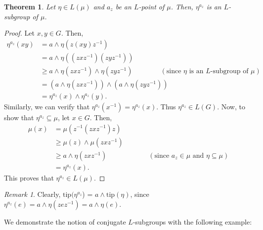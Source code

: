 \documentclass[10pt]{article}
\theoremstyle{plain}
\newtheorem{theorem}{Theorem}[section]
\theoremstyle{definition}
\theoremstyle{remark}
\newtheorem{remark}{\sc Remark}
\theoremstyle{case}
\begin{document}
\begin{theorem}
	Let $\eta \in L(\mu)$ and $a_z$ be an $L$-point of $\mu$. Then, $\eta^{a_z}$ is an $L$-subgroup of $\mu$.
\end{theorem}
\begin{proof}
	Let $x,y \in G$. Then,
	\begin{equation*}
		\begin{split}
			\eta^{a_z}(xy) &= a \wedge \eta(z(xy)z^{-1}) \\
			&= a \wedge \eta((zxz^{-1})(zyz^{-1})) \\
			&\geq a \wedge \eta(zxz^{-1}) \wedge \eta(zyz^{-1}) \qquad \qquad (\text{since $\eta$ is an $L$-subgroup of $\mu$}) \\
			&= (a \wedge \eta(zxz^{-1})) \wedge (a \wedge \eta(zyz^{-1})) \\
			&= \eta^{a_z}(x) \wedge \eta^{a_z}(y).  
		\end{split}
	\end{equation*}
	Similarly, we can verify that
	$
	\eta^{a_z}(x^{-1}) = \eta^{a_z}(x).  
	$
	Thus $\eta^{a_z} \in L(G).$ Now, to show that $\eta^{a_z} \subseteq \mu$, let $x \in G$. Then,
	\begin{equation*}
	\begin{split}
		\mu(x) &= \mu(z^{-1}(zxz^{-1})z) \\
		&\geq \mu(z) \wedge \mu(zxz^{-1}) \\
		&\geq a \wedge \eta(zxz^{-1}) \qquad \qquad\qquad (\text{since $a_z \in \mu$ and $\eta \subseteq \mu$}) \\
		&= \eta^{a_z}(x).
	\end{split}
	\end{equation*}
This proves that $\eta^{a_z} \in L(\mu)$.
\end{proof}

\begin{remark}\label{conj_tip}
	Clearly, $\text{tip}(\eta^{a_z}$) = $a \wedge \text{tip}(\eta)$, since
	$ \eta^{a_z}(e) = a \wedge \eta(zez^{-1}) = a \wedge \eta(e).$
\end{remark}
\noindent We demonstrate the notion of conjugate $L$-subgroups with the following example:
\end{document}
